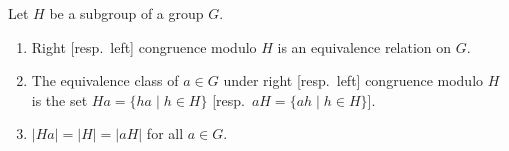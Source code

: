 \begin{theorem}
Let $H$ be a subgroup of a group $G$.
\begin{enumerate}
    \item[(i)] Right [resp.\ left] congruence modulo $H$ is an equivalence relation on $G$.
    \item[(ii)] The equivalence class of $a \in G$ under right [resp.\ left] congruence modulo $H$ is the set $Ha = \{ha \mid h \in H\}$ [resp.\ $aH = \{ah \mid h \in H\}$].
    \item[(iii)] $|Ha| = |H| = |aH|$ for all $a \in G$.
\end{enumerate}
\end{theorem}

